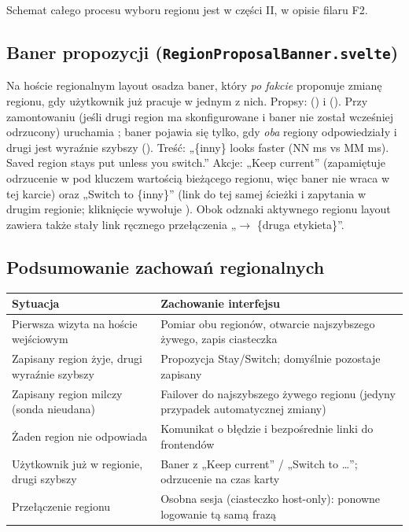 Schemat całego procesu wyboru regionu jest w części II, w opisie filaru F2.

\subsection{Baner propozycji (\texttt{RegionProposalBanner.svelte})}

Na hoście regionalnym layout osadza baner, który \emph{po fakcie} proponuje zmianę regionu, gdy
użytkownik już pracuje w jednym z nich. Propsy:  () i 
(). Przy zamontowaniu (jeśli drugi region ma skonfigurowane 
i baner nie został wcześniej odrzucony) uruchamia ; baner pojawia się tylko, gdy
\emph{oba} regiony odpowiedziały i drugi jest wyraźnie szybszy ().
Treść: „\{inny\} looks faster (NN ms vs MM ms). Saved region stays put unless you switch.” Akcje:
„Keep current” (zapamiętuje odrzucenie w  pod kluczem
 wartością bieżącego regionu, więc baner nie wraca w tej karcie)
oraz „Switch to \{inny\}” (link do tej samej ścieżki i zapytania w drugim regionie; kliknięcie wywołuje
). Obok odznaki aktywnego regionu layout zawiera także stały link
ręcznego przełączenia „$\rightarrow$ \{druga etykieta\}”.

\subsection{Podsumowanie zachowań regionalnych}

\begin{longtable}{@{}p{}p{}@{}}
\toprule
\textbf{Sytuacja} & \textbf{Zachowanie interfejsu} \\
\midrule
\endhead
Pierwsza wizyta na hoście wejściowym & Pomiar obu regionów, otwarcie najszybszego żywego, zapis ciasteczka \\
Zapisany region żyje, drugi wyraźnie szybszy & Propozycja Stay/Switch; domyślnie pozostaje zapisany \\
Zapisany region milczy (sonda nieudana) & Failover do najszybszego żywego regionu (jedyny przypadek automatycznej zmiany) \\
Żaden region nie odpowiada & Komunikat o błędzie i bezpośrednie linki do frontendów \\
Użytkownik już w regionie, drugi szybszy & Baner z „Keep current” / „Switch to \ldots”; odrzucenie na czas karty \\
Przełączenie regionu & Osobna sesja (ciasteczko host-only): ponowne logowanie tą samą frazą \\
\bottomrule
\end{longtable}

